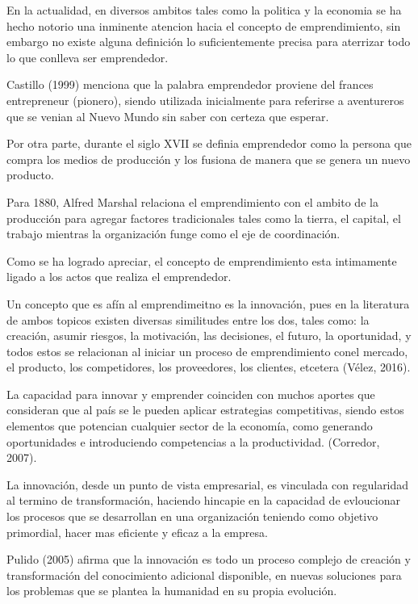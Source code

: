 \documentclass{memoir}
\begin{document}
En la actualidad, en diversos ambitos tales como la politica y la economia se ha hecho notorio una inminente atencion hacia el concepto de emprendimiento, sin embargo no existe alguna definición lo suficientemente precisa para aterrizar todo lo que conlleva ser emprendedor.

Castillo (1999) menciona que la palabra emprendedor proviene del frances entrepreneur (pionero), siendo utilizada inicialmente para referirse a aventureros que se venian al Nuevo Mundo sin saber con certeza que esperar.

Por otra parte, durante el siglo XVII se definia emprendedor como la persona que compra los medios de producción y los fusiona de manera que se genera un nuevo producto.

Para 1880, Alfred Marshal relaciona el emprendimiento con el ambito de la producción para agregar factores tradicionales tales como la tierra, el capital, el trabajo mientras la organización funge como el eje de coordinación.

Como se ha logrado apreciar, el concepto de emprendimiento esta intimamente ligado a los actos que realiza el emprendedor.

Un concepto que es afín al emprendimeitno es la innovación, pues en la literatura de ambos topicos existen diversas similitudes entre los dos, tales como: la creación,  asumir  riesgos,  la  motivación,  las  decisiones,  el  futuro,  la  oportunidad,  y  todos  estos  se relacionan al iniciar un proceso de emprendimiento conel mercado, el producto, los competidores, los proveedores, los clientes, etcetera (Vélez, 2016).

La capacidad para innovar y emprender coinciden con muchos aportes que consideran que al país se le pueden aplicar estrategias competitivas, siendo estos elementos que potencian cualquier sector de la  economía,  como  generando  oportunidades  e  introduciendo  competencias  a  la  productividad. (Corredor, 2007).

La innovación, desde un punto de vista empresarial, es vinculada con regularidad al termino de transformación, haciendo hincapie en la capacidad de evloucionar los procesos que se desarrollan en una organización teniendo como objetivo primordial, hacer mas eficiente y eficaz a la empresa.

Pulido (2005) afirma que la innovación  es  todo  un  proceso  complejo  de  creación  y  transformación  del  conocimiento  adicional  disponible,  en  nuevas  soluciones  para  los  problemas  que  se  plantea  la  humanidad  en  su  propia  evolución.
\end{document}
